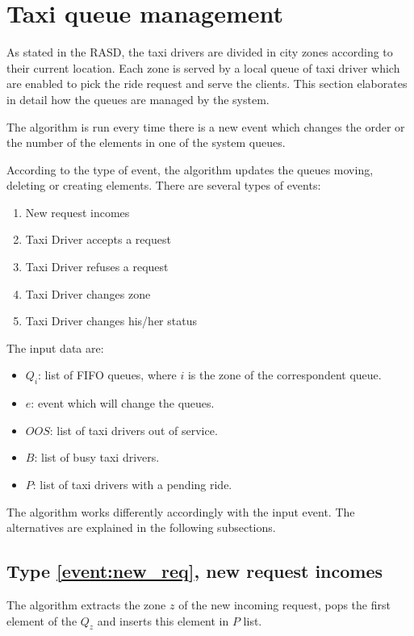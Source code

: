 \section{Taxi queue management}
As stated in the RASD, the taxi drivers are divided in city zones according to their current location. Each zone is served by a local queue of taxi driver which are enabled to pick the ride request and serve the clients. This section elaborates in detail how the queues are managed by the system.

The algorithm is run every time there is a new event which changes the order or the number of the elements in one of the system queues.

According to the type of event, the algorithm updates the queues moving, deleting or creating elements. There are several types of events:
\begin{enumerate}
	\item New request incomes \label{event:new_req}
	\item Taxi Driver accepts a request \label{event:accepted_req}
	\item Taxi Driver refuses a request \label{event:refuses_req}
	\item Taxi Driver changes zone \label{event:changed_zone}
	\item Taxi Driver changes his/her status \label{event:changed_status}
\end{enumerate}
The input data are:
\begin{itemize}
	\item $Q_i$: list of FIFO queues, where $i$ is the zone of the correspondent queue.
	\item $e$: event which will change the queues.
	\item $OOS$: list of taxi drivers out of service.
	\item $B$: list of busy taxi drivers.
	\item $P$: list of taxi drivers with a pending ride.
\end{itemize}

The algorithm works differently accordingly with the input event. The alternatives are explained in the following subsections.

\subsection{Type \ref{event:new_req}, new request incomes}
The algorithm extracts the zone $z$ of the new incoming request, pops the first element of the $Q_z$ and inserts this element in $P$ list.

